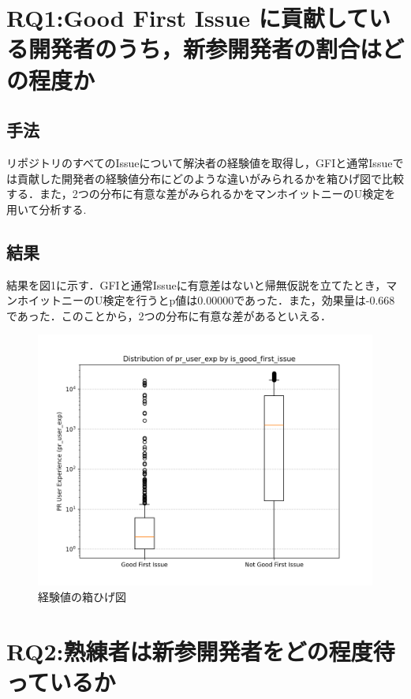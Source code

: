 \documentclass[twocolumn]{jarticle} %
\newcommand{\RQOne}{Good First Issue に貢献している開発者のうち，新参開発者の割合はどの程度か}
\newcommand{\RQTwo}{熟練者は新参開発者をどの程度待っているか}
\begin{document}
\section{RQ1:\RQOne}\label{sec:rq1}

\subsection{手法}
リポジトリのすべてのIssueについて解決者の経験値を取得し，GFIと通常Issueでは貢献した開発者の経験値分布にどのような違いがみられるかを箱ひげ図で比較する．また，2つの分布に有意な差がみられるかをマンホイットニーのU検定を用いて分析する.

\subsection{結果}
結果を図1に示す．GFIと通常Issueに有意差はないと帰無仮説を立てたとき，マンホイットニーのU検定を行うとp値は0.00000であった．また，効果量は-0.668であった．このことから，2つの分布に有意な差があるといえる．

\begin{figure}[H]
\centerline{\includegraphics[width=0.9\linewidth]{@BSthesis2024_Nakai/BSthesis2024_Nakai_fig/2025-02-03_11h12_00.png}}
\caption{経験値の箱ひげ図}
\label{fig:milestone}
\end{figure}

\section{RQ2:\RQTwo}\label{sec:rq2}
\end{document}
